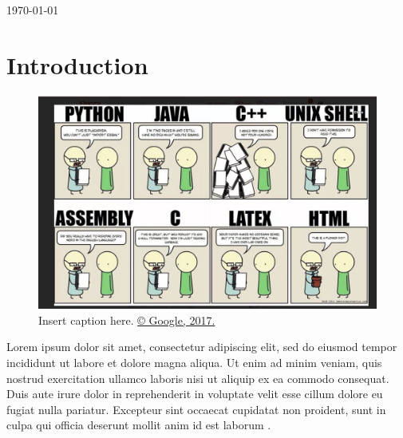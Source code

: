 \documentclass[a4paper,titlepage]{article}
\begin{document}
\begin{titlepage}
{\large \today}\\[3cm] %




\vfill %

\end{titlepage}

\tableofcontents
\newpage

\section{Introduction}


\begin{figure}[H]
\centering
\includegraphics[width=15cm]{Images/coding-jokes.jpg}
\caption{Insert caption here. \href{https://www.google.com/}{© Google, 2017.}}
\end{figure}

Lorem ipsum dolor sit amet, consectetur adipiscing elit, sed do eiusmod tempor incididunt ut labore et dolore magna aliqua. Ut enim ad minim veniam, quis nostrud exercitation ullamco laboris nisi ut aliquip ex ea commodo consequat. Duis aute irure dolor in reprehenderit in voluptate velit esse cillum dolore eu fugiat nulla pariatur. Excepteur sint occaecat cupidatat non proident, sunt in culpa qui officia deserunt mollit anim id est laborum \cite{Example1}.
\end{document}
